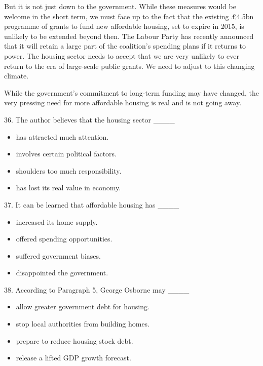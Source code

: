 \documentclass[UTF8,11pt]{ctexart}
\begin{document}
But it is not just down to the government. While these measures would be welcome in the short term, we must face up to the fact that the existing £4.5bn programme of grants to fund new affordable housing, set to expire in 2015, is unlikely to be extended beyond then. The Labour Party has recently announced that it will retain a large part of the coalition’s spending plans if it returns to power. The housing sector needs to accept that we are very unlikely to ever return to the era of large-scale public grants. We need to adjust to this changing climate.


While the government’s commitment to long-term funding may have changed, the very pressing need for more affordable housing is real and is not going away.


36. The author believes that the housing sector \_\_\_\_


\begin{itemize}[leftmargin=2em,itemsep=.2em,topsep=.4em]\item[A.] has attracted much attention.
\item[B.] involves certain political factors.
\item[C.] shoulders too much responsibility.
\item[D.] has lost its real value in economy.
\end{itemize}

37. It can be learned that affordable housing has \_\_\_\_


\begin{itemize}[leftmargin=2em,itemsep=.2em,topsep=.4em]\item[A.] increased its home supply.
\item[B.] offered spending opportunities.
\item[C.] suffered government biases.
\item[D.] disappointed the government.
\end{itemize}

38. According to Paragraph 5, George Osborne may \_\_\_\_


\begin{itemize}[leftmargin=2em,itemsep=.2em,topsep=.4em]\item[A.] allow greater government debt for housing.
\item[B.] stop local authorities from building homes.
\item[C.] prepare to reduce housing stock debt.
\item[D.] release a lifted GDP growth forecast.
\end{itemize}
\end{document}
